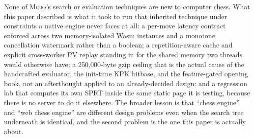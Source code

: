 \documentclass[10pt,twocolumn]{article}
\newcommand{\engine}{\textsc{Mojo}}
\begin{document}
None of \engine's search or evaluation techniques are new to computer chess.
What this paper described is what it took to run that inherited technique
under constraints a native engine never faces at all: a per-move latency
contract enforced across two memory-isolated Wasm instances and a monotone
cancellation watermark rather than a boolean; a repetition-aware cache and
explicit cross-worker PV replay standing in for the shared memory two
threads would otherwise have; a 250,000-byte gzip ceiling that is the actual
cause of the handcrafted evaluator, the init-time KPK bitbase, and the
feature-gated opening book, not an afterthought applied to an
already-decided design; and a regression lab that computes its own SPRT
inside the same static page it is testing, because there is no server to do
it elsewhere. The broader lesson is that ``chess engine'' and ``web chess
engine'' are different design problems even when the search tree underneath
is identical, and the second problem is the one this paper is actually
about.



\end{document}
